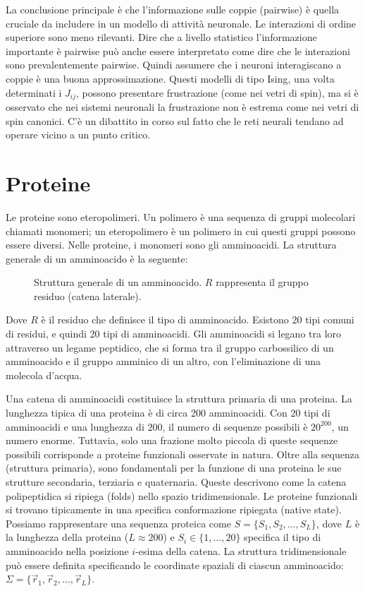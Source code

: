 La conclusione principale è che l'informazione sulle coppie (pairwise) è quella cruciale da includere in un modello di attività neuronale. Le interazioni di ordine superiore sono meno rilevanti. Dire che a livello statistico l'informazione importante è pairwise può anche essere interpretato come dire che le interazioni sono prevalentemente pairwise. Quindi assumere che i neuroni interagiscano a coppie è una buona approssimazione.
Questi modelli di tipo Ising, una volta determinati i $J_{ij}$, possono presentare frustrazione (come nei vetri di spin), ma si è osservato che nei sistemi neuronali la frustrazione non è estrema come nei vetri di spin canonici. C'è un dibattito in corso sul fatto che le reti neurali tendano ad operare vicino a un punto critico.


\section{Proteine}
Le proteine sono eteropolimeri. Un polimero è una sequenza di gruppi molecolari chiamati monomeri; un eteropolimero è un polimero in cui questi gruppi possono essere diversi.
Nelle proteine, i monomeri sono gli amminoacidi.
La struttura generale di un amminoacido è la seguente:

\begin{figure}[h!]
\centering
\caption{Struttura generale di un amminoacido. $R$ rappresenta il gruppo residuo (catena laterale).}
\label{fig:ch23_1}
\end{figure}

Dove $R$ è il residuo che definisce il tipo di amminoacido. Esistono 20 tipi comuni di residui, e quindi 20 tipi di amminoacidi.
Gli amminoacidi si legano tra loro attraverso un legame peptidico, che si forma tra il gruppo carbossilico di un amminoacido e il gruppo amminico di un altro, con l'eliminazione di una molecola d'acqua.

Una catena di amminoacidi costituisce la struttura primaria di una proteina. La lunghezza tipica di una proteina è di circa 200 amminoacidi.
Con 20 tipi di amminoacidi e una lunghezza di 200, il numero di sequenze possibili è $20^{200}$, un numero enorme. Tuttavia, solo una frazione molto piccola di queste sequenze possibili corrisponde a proteine funzionali osservate in natura.
Oltre alla sequenza (struttura primaria), sono fondamentali per la funzione di una proteina le sue strutture secondaria, terziaria e quaternaria. Queste descrivono come la catena polipeptidica si ripiega (folds) nello spazio tridimensionale. Le proteine funzionali si trovano tipicamente in una specifica conformazione ripiegata (native state).
Possiamo rappresentare una sequenza proteica come $S = \{S_1, S_2, \dots, S_L\}$, dove $L$ è la lunghezza della proteina ($L \approx 200$) e $S_i \in \{1, \dots, 20\}$ specifica il tipo di amminoacido nella posizione $i$-esima della catena.
La struttura tridimensionale può essere definita specificando le coordinate spaziali di ciascun amminoacido: $\Sigma = \{\vec{r}_1, \vec{r}_2, \dots, \vec{r}_L\}$.

